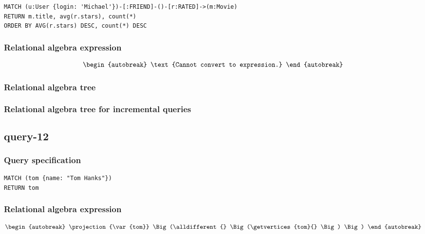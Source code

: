 \begin{lstlisting}
MATCH (u:User {login: 'Michael'})-[:FRIEND]-()-[r:RATED]->(m:Movie)
RETURN m.title, avg(r.stars), count(*)
ORDER BY AVG(r.stars) DESC, count(*) DESC
\end{lstlisting}

\subsubsection*{Relational algebra expression}

\begin{align*}
\begin{autobreak}
\text{Cannot convert to expression.}
\end{autobreak}
\end{align*}

\subsubsection*{Relational algebra tree}


\subsubsection*{Relational algebra tree for incremental queries}

\subsection{query-12}

\subsubsection*{Query specification}

\begin{lstlisting}
MATCH (tom {name: "Tom Hanks"})
RETURN tom
\end{lstlisting}

\subsubsection*{Relational algebra expression}

\begin{align*}
\begin{autobreak}
\projection{\var{tom}} \Big(\alldifferent{} \Big(\getvertices{tom}{}
\Big)
\Big)
\end{autobreak}
\end{align*}

